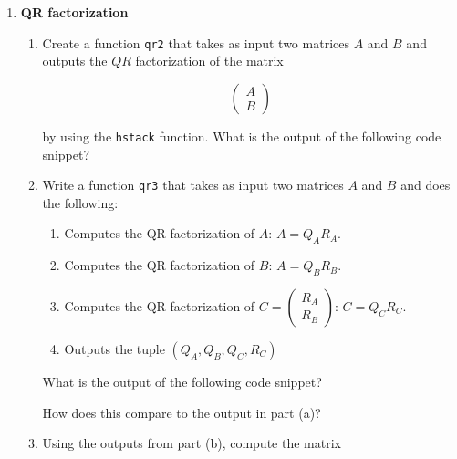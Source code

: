 \documentclass{article}
\begin{document}
\pagestyle{fancy}
\begin{enumerate}

\item \textbf{QR factorization}
\begin{enumerate}
\item Create a function \texttt{qr2} that takes as input two matrices $A$ and $B$ and outputs the $QR$ factorization of the matrix 

\[
\begin{pmatrix} A \\ B\end{pmatrix}
\]

by using the \texttt{hstack} function.  What is the output of the following code snippet?

\vspace{0.5cm}


\end{enumerate}

\begin{enumerate}
\setcounter{enumii}{1}
\item Write a function \texttt{qr3} that takes as input two matrices $A$ and $B$ and does the following:

\begin{enumerate}
\item Computes the QR factorization of $A$: $A = Q_AR_A$.
\item Computes the QR factorization of $B$: $A = Q_BR_B$.
\item Computes the QR factorization of $C = \begin{pmatrix}R_A \\ R_B \end{pmatrix}$: $C = Q_CR_C$.
\item Outputs the tuple $(Q_A, Q_B, Q_C, R_C)$
\end{enumerate}

\vspace{0.5cm}

What is the output of the following code snippet?

\vspace{0.5cm}


How does this compare to the output in part (a)?

\end{enumerate}

\begin{enumerate}
\setcounter{enumii}{2}
\item Using the outputs from part (b), compute the matrix


\end{enumerate}
\end{enumerate}
\end{document}

